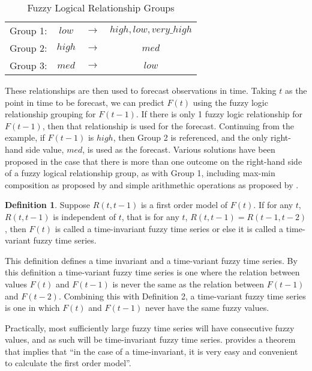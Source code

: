 \documentclass{article}
\theoremstyle{definition}
\newtheorem{ftsdef}{Definition}
\begin{document}
\begin{table}[h]
	\center
	\begin{tabular}{ c c c c }
  	Group 1: & $low$ & $\rightarrow$ & $high, low, very\_high$ \\
  	Group 2: & $high$ & $\rightarrow$ & $med$ \\
  	Group 3: & $med$ & $\rightarrow$ & $low$ \\
	\end{tabular}
	\caption{Fuzzy Logical Relationship Groups}
\end{table}

These relationships are then used to forecast observations in time. Taking $t$ as the point in time to be forecast, we can predict $F(t)$ using the fuzzy logic relationship grouping for $F(t-1)$. If there is only 1 fuzzy logic relationship for $F(t-1)$, then that relationship is used for the forecast. Continuing from the example, if $F(t-1)$ is $high$, then Group 2 is referenced, and the only right-hand side value, $med$, is used as the forecast. Various solutions have been proposed in the case that there is more than one outcome on the right-hand side of a fuzzy logical relationship group, as with Group 1, including max-min composition as proposed by \cite{song1993forecasting} and simple arithmethic operations as proposed by \cite{chen1996forecasting}.

\begin{ftsdef}
Suppose $R(t,t-1)$ is a first order model of $F(t)$. If for any $t$, $R(t,t-1)$ is independent of $t$, that is for any $t$, $R(t,t-1) = R(t-1,t-2)$, then $F(t)$ is called a time-invariant fuzzy time series or else it is called a time-variant fuzzy time series.
\end{ftsdef}

This definition defines a time invariant and a time-variant fuzzy time series. By this definition a time-variant fuzzy time series is one where the relation between values $F(t)$ and $F(t-1)$ is never the same as the relation between $F(t-1)$ and $F(t-2)$. Combining this with Definition 2, a time-variant fuzzy time series is one in which $F(t)$ and $F(t-1)$ never have the same fuzzy values. 

Practically, most sufficiently large fuzzy time series will have consecutive fuzzy values, and as such will be time-invariant fuzzy time series. \cite{song1993forecasting} provides a theorem that implies that ``in the case of a time-invariant, it is very easy and convenient to calculate the first order model''.
\end{document}
